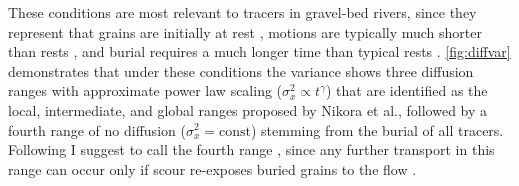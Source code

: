 These conditions are most relevant to tracers in gravel-bed rivers, since they represent that grains are initially at rest \citep{Hassan1991,Wu2019}, motions are typically much shorter than rests \citep{Einstein1937,Hubbell1964}, and burial requires a much longer time than typical rests  \citep{Ferguson2002,Hassan1994,Haschenburger2013}.
\DIFdelbegin {}\DIFdelend \DIFaddbegin {}\DIFaddend \ref{fig:diffvar} demonstrates that under these conditions the variance \DIFdelbegin \DIFdel{(\ref{eq:var} ) }\DIFdelend \DIFaddbegin \DIFadd{\ref{eq:var} }\DIFaddend shows three diffusion ranges with approximate power law scaling ($\sigma_x^2 \propto t^\gamma$) that are identified as the local, intermediate, and global ranges proposed by Nikora et al., followed by a fourth range of no diffusion ($\sigma_x^2 = \text{const}$) stemming from the burial of all tracers. 
Following \citet{Hassan2017} I suggest to call the fourth range \DIFdelbegin {}\DIFdelend \DIFaddbegin {}\DIFaddend , since any further transport in this range can occur only if scour re-exposes buried grains to the flow \citep{Nakagawa1980,Voepel2013,Martin2014,Wu2019a}.

